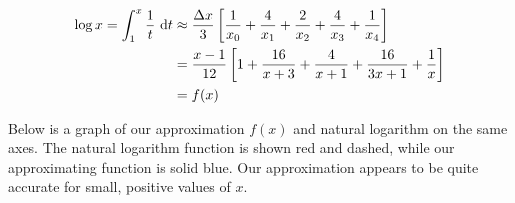 \begin{solution}
\begin{align*}
\log x=\int_1^x \frac{1}{t}~\mathrm{d}t&\approx \frac{\Delta x}{3}\left[\frac{1}{x_0}+\frac{4}{x_1}+\frac{2}{x_2}+\frac{4}{x_3}+\frac{1}{x_4}\right]\\
&=\frac{x-1}{12}\left[1+\frac{16}{x+3}+\frac{4}{x+1}+\frac{16}{3x+1}+\frac{1}{x}\right]\\
&=f(x)
\end{align*}

Below is a graph of our approximation $f(x)$ and natural logarithm on the same axes. The natural logarithm function is shown red and dashed, while our approximating function is solid blue. Our approximation appears to be quite accurate for small, positive values of $x$.
\begin{center}
\end{center}
\end{solution}


